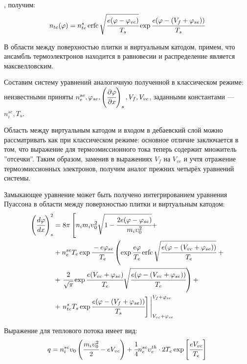 , получим:
\begin{equation}
	n_{te}(\varphi) = n_{te}^s\operatorname{erfc}{\sqrt{\cfrac{e(\varphi - \varphi_{vc})}{T_s}}}\exp{\cfrac{e(\varphi - (V_f + \varphi_{se}))}{T_s}}
\end{equation}

В области между поверхностью плитки и виртуальным катодом, примем, что ансамбль термоэлектронов находится в равновесии и 
распределение является максвелловским.

Составим систему уравнений аналогичную полученной в классическом режиме: неизвестными приняты $n_e^{se}, \varphi_{se}, \left(\cfrac{\partial \varphi}{\partial x}\right)_s, V_f, V_{vc}$,
заданными константами --- $n_i^{se}, T_s$.

Область между виртуальным катодом и входом в дебаевский слой можно рассматривать 
как при классическом режиме: основное отличие заключается в том, что выражение для 
термоэмиссионного тока теперь содержит множитель ''отсечки''. Таким образом, заменив 
в выражениях $V_f$ на $V_{vc}$ и учтя отражение термоэмиссионных электронов, получим 
аналог прежних четырёх уравнений системы.

Замыкающее уравнение может быть получено интегрированием уравнения Пуассона в области 
между поверхностью плитки и виртуальным катодом:
\begin{equation}
    \begin{split}
        \left(\cfrac{d\varphi}{dx}\right)^2_s &= 8\pi\left[n_im_i\upsilon_0^2\sqrt{1 - \cfrac{2e(\varphi - \varphi_{se})}{m_i\upsilon_0^2}} + \right.
        \\ &+ n_e^{se}T_e\exp{\cfrac{-e\varphi_{se}}{T_e}}\left(\exp{\cfrac{e\varphi}{T_e}}\operatorname{erfc}{\sqrt{\cfrac{e(\varphi - (V_{vc} + \varphi_{se}))}{T_e}}} \right.+ 
        \\ &+ \left. \cfrac{2}{\sqrt{\pi}}\exp{\cfrac{e(V_{vc} + \varphi_{se})}{T_e}}\sqrt{\cfrac{e(\varphi - (V_{vc} + \varphi_{se}))}{T_e}}\right) + 
        \\ &+ \left. n_{te}^sT_s\exp{\cfrac{e(\varphi - (V_f+\varphi_{se}))}{T_s}}\right]\Bigg|_{V_{vc} + \varphi_{se}}^{V_f + \varphi_{se}}
    \end{split}
    \label{eq::Poisson_SCL_alpha}
\end{equation}

Выражение для теплового потока имеет вид:
\begin{equation}
    q = n_i^{se}\upsilon_0\left(\cfrac{m_i\upsilon_0^2}{2} - eV_{vc}\right) + \cfrac{1}{4}n_e^{se}\upsilon_e^{th}\cdot2T_e\exp\left[\cfrac{eV_{vc}}{T_e}\right]
\end{equation}


